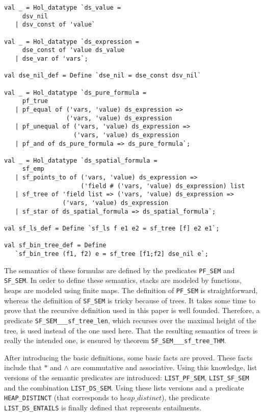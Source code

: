 \documentclass{scrartcl}
\theoremstyle{definition}
\newcommand{\heapdistinct}{\textit{heap\_distinct}}
\begin{document}
\begin{verbatim}
val _ = Hol_datatype `ds_value =
     dsv_nil
   | dsv_const of 'value`

val _ = Hol_datatype `ds_expression =
     dse_const of 'value ds_value
   | dse_var of 'vars`;

val dse_nil_def = Define `dse_nil = dse_const dsv_nil`

val _ = Hol_datatype `ds_pure_formula =
     pf_true
   | pf_equal of ('vars, 'value) ds_expression =>
                 ('vars, 'value) ds_expression
   | pf_unequal of ('vars, 'value) ds_expression =>
                   ('vars, 'value) ds_expression
   | pf_and of ds_pure_formula => ds_pure_formula`;

val _ = Hol_datatype `ds_spatial_formula =
     sf_emp
   | sf_points_to of ('vars, 'value) ds_expression =>
                     ('field # ('vars, 'value) ds_expression) list
   | sf_tree of 'field list => ('vars, 'value) ds_expression =>
                ('vars, 'value) ds_expression
   | sf_star of ds_spatial_formula => ds_spatial_formula`;

val sf_ls_def = Define `sf_ls f e1 e2 = sf_tree [f] e2 e1`;

val sf_bin_tree_def = Define
   `sf_bin_tree (f1, f2) e = sf_tree [f1;f2] dse_nil e`;
\end{verbatim}

The semantics of these formulas are defined by the predicates \texttt{PF\_SEM}
and \texttt{SF\_SEM}. In order to define these semantics, stacks are modeled
by functions, heaps are modeled using finite maps. The definition of
\texttt{PF\_SEM} is straightforward, whereas the definition of
\texttt{SF\_SEM} is tricky because of trees. It takes some time to prove
that the recursive definition used in this paper is well founded.  Therefore,
a predicate \texttt{SF\_SEM\_\_\_sf\_tree\_len}, which recurses over the
maximal height of the tree, is used instead of the one used here. That
the resulting semantics of trees is really the intended one, is ensured by
theorem \texttt{SF\_SEM\_\_\_sf\_tree\_THM}.

After introducing the basic definitions, some basic facts are proved. These
facts include that $*$ and $\wedge$ are commutative and associative. Using
this knowledge, list versions of the semantic predicates are introduced:
\texttt{LIST\_PF\_SEM}, \texttt{LIST\_SF\_SEM} and the combination
\texttt{LIST\_DS\_SEM}. Using these lists versions and a predicate
\texttt{HEAP\_DISTINCT} (that corresponds to $\heapdistinct$), the predicate
\texttt{LIST\_DS\_ENTAILS} is finally defined that represents entailments.
\end{document}
